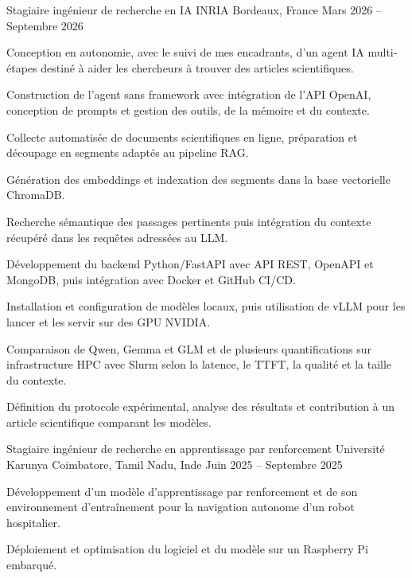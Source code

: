 
\begin{cventries}
  \cventry
    {Stagiaire ingénieur de recherche en IA}
    {INRIA}
    {Bordeaux, France}
    {Mars 2026 -- Septembre 2026}
    {
      \begin{cvitems}
        \item {Conception en autonomie, avec le suivi de mes encadrants, d’un agent IA multi-étapes destiné à aider les chercheurs à trouver des articles scientifiques.}
        \item {Construction de l’agent sans framework avec intégration de l’API OpenAI, conception de prompts et gestion des outils, de la mémoire et du contexte.}
        \item {Collecte automatisée de documents scientifiques en ligne, préparation et découpage en segments adaptés au pipeline RAG.}
        \item {Génération des embeddings et indexation des segments dans la base vectorielle ChromaDB.}
        \item {Recherche sémantique des passages pertinents puis intégration du contexte récupéré dans les requêtes adressées au LLM.}
        \item {Développement du backend Python/FastAPI avec API REST, OpenAPI et MongoDB, puis intégration avec Docker et GitHub CI/CD.}
        \item {Installation et configuration de modèles locaux, puis utilisation de vLLM pour les lancer et les servir sur des GPU NVIDIA.}
        \item {Comparaison de Qwen, Gemma et GLM et de plusieurs quantifications sur infrastructure HPC avec Slurm selon la latence, le TTFT, la qualité et la taille du contexte.}
        \item {Définition du protocole expérimental, analyse des résultats et contribution à un article scientifique comparant les modèles.}
      \end{cvitems}
    }

  \cventry
    {Stagiaire ingénieur de recherche en apprentissage par renforcement}
    {Université Karunya}
    {Coimbatore, Tamil Nadu, Inde}
    {Juin 2025 -- Septembre 2025}
    {
      \begin{cvitems}
        \item {Développement d’un modèle d’apprentissage par renforcement et de son environnement d’entraînement pour la navigation autonome d’un robot hospitalier.}
        \item {Déploiement et optimisation du logiciel et du modèle sur un Raspberry Pi embarqué.}
      \end{cvitems}
    }
\end{cventries}
